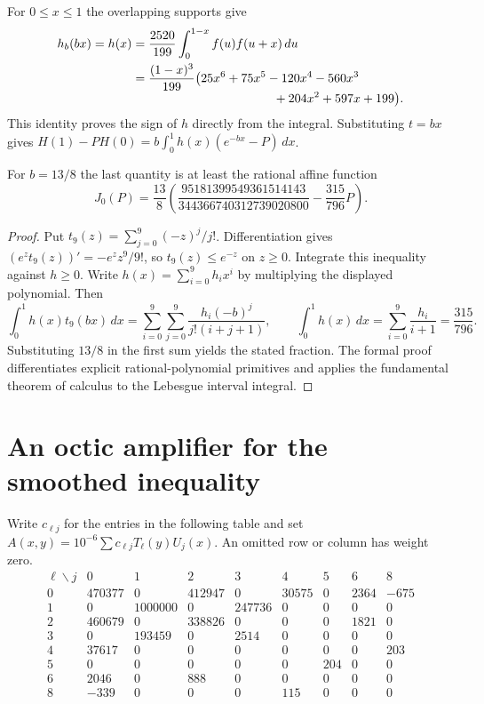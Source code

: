 \documentclass[11pt]{article}
\begin{document}
For $0\le x\le1$ the overlapping supports give
\[
\begin{split}
 h_b(bx)=h(x)&=\frac{2520}{199}\int_0^{1-x} f(u) f(u+x)\,du\\
 &=\frac{(1-x)^3}{199}\big(25x^6+75x^5-120x^4-560x^3\\[-3pt]
 &\hspace{40mm}+204x^2+597x+199\big).
\end{split}
\]
This identity proves the sign of $h$ directly from the integral. Substituting $t=bx$ gives $H(1)-PH(0)=b\int_0^1 h(x)(e^{-bx}-P)\,dx$.
\begin{lemma}
For $b=13/8$ the last quantity is at least the rational affine function
\[
 J_0(P)=\frac{13}{8}\left(\frac{95181399549361514143}{344366740312739020800}
                          -\frac{315}{796}P\right).
\]
\end{lemma}
\begin{proof}
Put $t_9(z)=\sum_{j=0}^9(-z)^j/j!$. Differentiation gives $(e^z t_9(z))'=-e^z z^9/9!$, so $t_9(z)\le e^{-z}$ on $z\ge0$. Integrate this inequality against $h\ge0$. Write $h(x)=\sum_{i=0}^9 h_i x^i$ by multiplying the displayed polynomial. Then
\[
 \int_0^1 h(x)t_9(bx)\,dx=\sum_{i=0}^9\sum_{j=0}^9\frac{h_i(-b)^j}{j!(i+j+1)},
 \qquad \int_0^1 h(x)\,dx=\sum_{i=0}^9\frac{h_i}{i+1}=\frac{315}{796}.
\]
Substituting $13/8$ in the first sum yields the stated fraction. The formal proof differentiates explicit rational-polynomial primitives and applies the fundamental theorem of calculus to the Lebesgue interval integral.
\end{proof}


\section{An octic amplifier for the smoothed inequality}
Write $c_{\ell j}$ for the entries in the following table and set
$A(x,y)=10^{-6}\sum c_{\ell j}T_\ell(y)U_j(x)$.
An omitted row or column has weight zero.
\[
\begin{array}{c|rrrrrrrr}
\ell\backslash j&0&1&2&3&4&5&6&8\\\hline
0&470377&0&412947&0&30575&0&2364&-675\\
1&0&1000000&0&247736&0&0&0&0\\
2&460679&0&338826&0&0&0&1821&0\\
3&0&193459&0&2514&0&0&0&0\\
4&37617&0&0&0&0&0&0&203\\
5&0&0&0&0&0&204&0&0\\
6&2046&0&888&0&0&0&0&0\\
8&-339&0&0&0&115&0&0&0
\end{array}
\]
\end{document}
